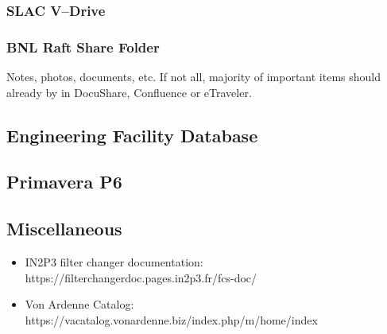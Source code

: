	\subsubsection{SLAC V--Drive}
	
	\subsubsection{BNL Raft Share Folder}
	Notes, photos, documents, etc. If not all, majority of important items should already by in DocuShare, Confluence or eTraveler.
	
\subsection{Engineering Facility Database}

\subsection{Primavera P6}

\subsection{Miscellaneous}
\begin{itemize}
	\item IN2P3 filter changer documentation: https://filterchangerdoc.pages.in2p3.fr/fcs-doc/
	\item Von Ardenne Catalog: https://vacatalog.vonardenne.biz/index.php/m/home/index
\end{itemize}







